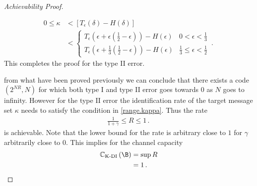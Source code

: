 \begin{proof}[Achievability Proof]
\begin{itemize}
\begin{enumerate}
\begin{align}
    0 \leq \kappa &< \left[T_\epsilon\left(\delta \right)-H\left(\delta \right)\right]  
    \nonumber\\
 &< \begin{cases}
    T_\epsilon\left(\epsilon + \epsilon(\frac{1}{2} - \epsilon) \right)- H\left(\epsilon \right)  & 0 < \epsilon < \frac{1}{3}
    \\
    T_\epsilon\left(\epsilon + \frac{1}{3}(\frac{1}{2} - \epsilon) \right) - H\left(\epsilon \right)
     & \frac{1}{3} \leq \epsilon < \frac{1}{2}
    \end{cases} \,.\,
\end{align}
This completes the proof for the type II error.
        \end{enumerate}
\end{itemize}

from what have been proved previously we can conclude that there exists a code $(2^{NR},N)$ for which both type I and type II error goes towards $0$ as $N$ goes to infinity. However for the type II error the identification rate of the target message set $\kappa$ needs to satisfy the condition in \eqref{range.kappa}. Thus the rate \begin{align}
         \frac{1}{1+\gamma} \leq R \leq 1\,.\,
        \end{align}
        is achievable. Note that the lower bound for the rate is arbitrary close to $1$ for $\gamma$ arbitrarily close to $0$. This implies for the channel capacity
        \begin{align}
        \mathbb{C}_{\text{K-DI}}\left( \B \right) &= \sup R \\
        & = 1 \,.\,
        \end{align}
\end{proof}
